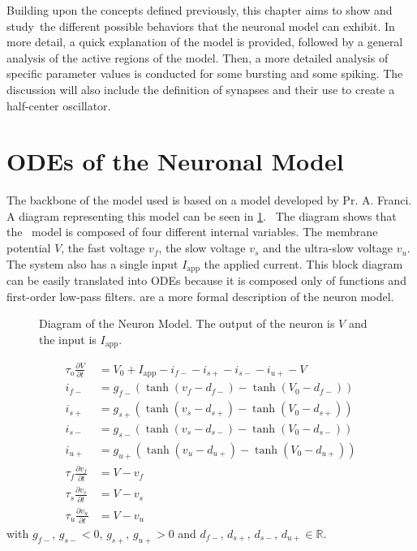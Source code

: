 \label{sec:model}

Building upon the concepts defined previously, this chapter aims to show and study the different possible behaviors that the neuronal model can exhibit.
In more detail, a quick explanation of the model is provided, followed by a general analysis of the active regions of the model. Then, a more detailed analysis of specific parameter values is conducted for some bursting and some spiking.
The discussion will also include the definition of synapses and their use to create a half-center oscillator.

\section{ODEs of the Neuronal Model}

The backbone of the model used is based on a model developed by Pr. A. Franci.
A diagram representing this model can be seen in \cref{fig:neuron_mod}. 
The diagram shows that the  model is composed of four different internal variables.
The membrane potential $V$, the fast voltage $v_f$, the slow voltage $v_s$ and the ultra-slow voltage $v_u$.
The system also has a single input $I_\text{app}$ the applied current.
This block diagram can be easily translated into ODEs because it is composed only of functions and first-order low-pass filters.
 are a more formal description of the neuron model.

\begin{figure}[!hb]
    \centering
    \caption{Diagram of the Neuron Model. The output of the neuron is $V$ and the input is $I_\text{app}$.}
    \label{fig:neuron_mod}
\end{figure}

\begin{align}
    \tau_o\frac{\partial V}{\partial t} &= V_0 + I_\text{app} - i_{f-} - i_{s+} - i_{s-} - i_{u+} - V\label{eq:neur_start}\\
    i_{f-} &= g_{f-}\left(\tanh\left(v_f-d_{f-}\right) - \tanh\left(V_0-d_{f-}\right)\right)\\ 
    i_{s+} &= g_{s+}\left(\tanh\left(v_s-d_{s+}\right) - \tanh\left(V_0-d_{s+}\right)\right)\\ 
    i_{s-} &= g_{s-}\left(\tanh\left(v_s-d_{s-}\right) - \tanh\left(V_0-d_{s-}\right)\right)\\ 
    i_{u+} &= g_{u+}\left(\tanh\left(v_u-d_{u+}\right) - \tanh\left(V_0-d_{u+}\right)\right)\\ 
    \tau_f\frac{\partial v_f}{\partial t} &= V - v_f\\
    \tau_s\frac{\partial v_s}{\partial t} &= V - v_s\\
    \tau_u\frac{\partial v_u}{\partial t} &= V - v_u\label{eq:neur_end}   
\end{align}
with $g_{f-},\, g_{s-} < 0$, $g_{s+},\, g_{u+} > 0$ and $d_{f-},\, d_{s+},\, d_{s-},\, d_{u+} \in \mathbb{R}$.

